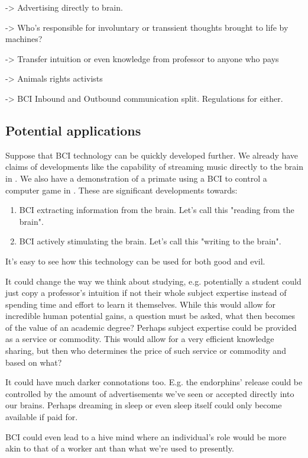 \documentclass[fleqn,11pt]{olplainarticle}
\begin{document}
-> Advertising directly to brain.

-> Who's responsible for involuntary or transsient thoughts brought to life by machines?

-> Transfer intuition or even knowledge from professor to anyone who pays

-> Animals rights activists

-> BCI Inbound and Outbound communication split. Regulations for either.

\subsection{Potential applications}
Suppose that BCI technology can be quickly developed further. We already have claims of developments like the capability of streaming music directly to the brain in \cite{pero_2020}. We also have a demonstration of a primate using a BCI to control a computer game in \cite{wakefield_2020}. These are significant developments towards:
\begin{enumerate}
    \item BCI extracting information from the brain. Let's call this "reading from the brain".
    \item BCI actively stimulating the brain. Let's call this "writing to the brain".
\end{enumerate}
It's easy to see how this technology can be used for both good and evil. 

It could change the way we think about studying, e.g. potentially a student could just copy a professor's intuition if not their whole subject expertise instead of spending time and effort to learn it themselves. While this would allow for incredible human potential gains, a question must be asked, what then becomes of the value of an academic degree? Perhaps subject expertise could be provided as a service or commodity. This would allow for a very efficient knowledge sharing, but then who determines the price of such service or commodity and based on what?

It could have much darker connotations too. E.g. the endorphins' release could be controlled by the amount of advertisements we've seen or accepted directly into our brains. Perhaps dreaming in sleep or even sleep itself could only become available if paid for. 

BCI could even lead to a hive mind where an individual's role would be more akin to that of a worker ant than what we're used to presently.
\end{document}
